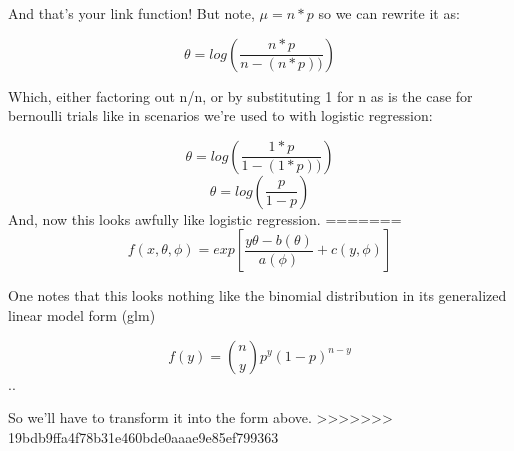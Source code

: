 \documentclass[
]{article}
\begin{document}
And that's your link function! But note, \(\mu = n*p\) so we can rewrite
it as:

\[\theta = log(\frac{n*p}{n-(n*p))})\]

Which, either factoring out n/n, or by substituting 1 for n as is the
case for bernoulli trials like in scenarios we're used to with logistic
regression:

\[\theta = log(\frac{1*p}{1-(1*p))})\] \[\theta = log(\frac{p}{1-p})\]
And, now this looks awfully like logistic regression.
=======
\[f(x, \theta, \phi) = exp[\frac{y\theta-b(\theta)}{a(\phi)} + c(y, \phi)]\]

One notes that this looks nothing like the binomial distribution in its
generalized linear model form (glm)

\[f(y) = {n \choose y}p^y(1-p)^{n-y}\] ..

So we'll have to transform it into the form above.
>>>>>>> 19bdb9ffa4f78b31e460bde0aaae9e85ef799363
\end{document}
